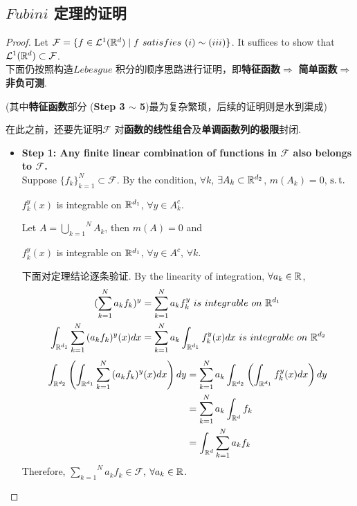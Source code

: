 \subsection{$Fubini$ 定理的证明}
	\begin{proof}
		Let $\mathcal{F} = \{ f \in \mathcal{L}^{1}(\R^d) \mid f \,\, satisfies \,\, (\rmnum{1}) \sim (\rmnum{3}) \}$. It suffices to show that $\mathcal{L}^{1}(\mathbb{R}^d) \subset \mathcal{F}$. \\
		下面仍按照构造$Lebesgue$ 积分的顺序思路进行证明，即\textbf{特征函数}$\Rightarrow$ \textbf{简单函数}$\Rightarrow$ \textbf{非负可测}.
		\begin{center}
			(其中\textbf{特征函数}部分 (\textbf{Step 3 $\sim$ 5})最为复杂繁琐，后续的证明则是水到渠成)
		\end{center}
		在此之前，还要先证明$\mathcal{F}$ 对\textbf{函数的线性组合}及\textbf{单调函数列的极限}封闭.
		
		\vspace{2em}
		
		\begin{itemize}
			\item \textbf{Step 1: Any finite linear combination of functions in $\mathcal{F}$ also belongs to $\mathcal{F}$.} \\
			Suppose $\{ f_k \}_{k = 1}^N \subset \mathcal{F}$. By the condition, $\forall k$, $\exists A_k \subset \mathbb{R}^{d_2}$, $m(A_k) = 0$, $\operatorname{s.t.}$
			\begin{center}
				$f_{k}^{y}(x)$ is integrable on $\mathbb{R}^{d_1}$, $\forall y \in A_{k}^c$.
			\end{center}
			Let $A = \overset{N}{\underset{k = 1}{\bigcup}}{A_k}$, then $m(A) = 0$ and
			\begin{center}
				$f_{k}^{y}(x)$ is integrable on $\mathbb{R}^{d_1}$, $\forall y \in A^c$, $\forall k$.
			\end{center}
			下面对定理结论逐条验证. By the linearity of integration, $\forall a_k \in \mathbb{R}$,
			\begin{align}
				(\sum_{k = 1}^{N}{a_k f_k})^{y} 
				&= \sum_{k = 1}^{N}{a_k f_{k}^{y}} \,\, is \,\, integrable \,\, on \,\, \mathbb{R}^{d_1} \\
				\int_{\mathbb{R}^{d_1}}{\sum_{k = 1}^{N}{(a_k f_k)^{y}}(x) dx} 
				&= \sum_{k = 1}^{N}{a_k \int_{\mathbb{R}^{d_1}}{f_{k}^{y}(x) dx}} \,\, is \,\, integrable \,\, on \,\, \mathbb{R}^{d_2}
			\end{align}
			\begin{align}
				\int_{\mathbb{R}^{d_2}}{\left( \int_{\mathbb{R}^{d_1}}{\sum_{k = 1}^{N}{(a_k f_k)^{y}}(x) dx} \right) dy}
				&= \sum_{k = 1}^{N} a_k \int_{\mathbb{R}^{d_2}}{\left( \int_{\mathbb{R}^{d_1}}{f_{k}^{y}(x) dx} \right) dy} \\
				&= \sum_{k = 1}^{N} a_k \int_{\mathbb{R}^d}{f_k} \\
				&= \int_{\mathbb{R}^d}{\sum_{k = 1}^{N}{a_k f_k}} \\
			\end{align}
			Therefore, $\overset{N}{\underset{k = 1}{\sum}}{a_k f_k} \in \mathcal{F}$, $\forall a_k \in \mathbb{R}$.
			

\end{itemize}
\end{proof}
